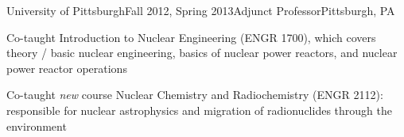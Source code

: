 \clearpage
\begin{rSubsection}{University of Pittsburgh}{Fall 2012, Spring 2013}{Adjunct Professor}{Pittsburgh, PA}
\item Co-taught Introduction to Nuclear Engineering (ENGR 1700), which covers theory / basic nuclear engineering, basics of nuclear power reactors, and nuclear power reactor operations
\item Co-taught \textit{new} course Nuclear Chemistry and Radiochemistry (ENGR 2112): responsible for nuclear astrophysics and migration of radionuclides through the environment
\end{rSubsection}



%
